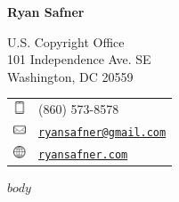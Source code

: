 \documentclass[11pt]{article}
\def\name{Ryan Safner}
\def\footerlink{http://ryansafner.com/cv.pdf}
\begin{document}
{\Huge \rmfamily \textbf{\name}}


\vspace{0.25in}

\begin{minipage}{0.45\linewidth}
  U.S. Copyright Office\\
  101 Independence Ave. SE\\
  Washington, DC 20559\\
\end{minipage}
\begin{minipage}{0.45\linewidth}
  \begin{tabular}{ll}
    \includegraphics[height=1em]{cell} & (860) 573-8578 \\
    \includegraphics[height=1em]{mail}& \href{mailto:ryansafner@gmail.com}{\tt ryansafner@gmail.com} \\
    \includegraphics[height=1em]{web} & \href{http://ryansafner.com}{\tt ryansafner.com} \\
  \end{tabular}
\end{minipage}

$body$

\end{document}
